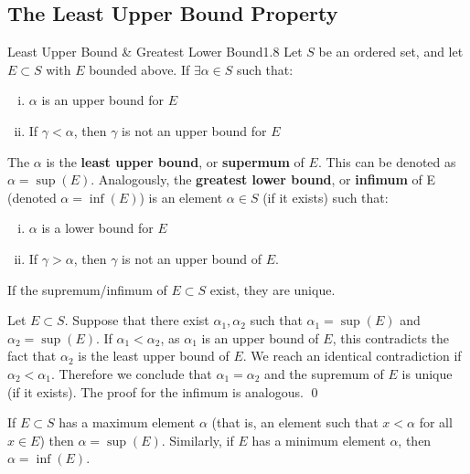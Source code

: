 \subsection{The Least Upper Bound Property}
\begin{definition}{Least Upper Bound \& Greatest Lower Bound}{1.8}
    Let $S$ be an ordered set, and let $E \subset S$ with $E$ bounded above. If $\exists \alpha \in S$ such that:
    \begin{enumerate}[(i)]
        \item $\alpha$ is an upper bound for $E$
        \item If $\gamma < \alpha$, then $\gamma$ is not an upper bound for $E$
    \end{enumerate} 
    The $\alpha$ is the \textbf{least upper bound}, or \textbf{supermum} of $E$. This can be denoted as $\alpha = \sup(E)$. Analogously, the \textbf{greatest lower bound}, or \textbf{infimum} of E (denoted $\alpha = \inf(E)$) is an element $\alpha \in S$ (if it exists) such that:
    \begin{enumerate}[(i)]
        \item $\alpha$ is a lower bound for $E$
        \item If $\gamma > \alpha$, then $\gamma$ is not an upper bound of $E$. 
    \end{enumerate}
\end{definition}

\begin{ntheorem}{}
    If the supremum/infimum of $E \subset S$ exist, they are unique.
\end{ntheorem}
\begin{nproof}
        Let $E \subset S$. Suppose that there exist $\alpha_1, \alpha_2$ such that $\alpha_1 = \sup(E)$ and $\alpha_2 = \sup(E)$. If $\alpha_1 < \alpha_2$, as $\alpha_1$ is an upper bound of $E$, this contradicts the fact that $\alpha_2$ is the least upper bound of $E$. We reach an identical contradiction if $\alpha_2 < \alpha_1$. Therefore we conclude that $\alpha_1 = \alpha_2$ and the supremum of $E$ is unique (if it exists). The proof for the infimum is analogous. \qed
\end{nproof}

\begin{ntheorem}{}
    If $E \subset S$ has a maximum element $\alpha$ (that is, an element such that $x < \alpha$ for all $x \in E$) then $\alpha = \sup(E)$. Similarly, if $E$ has a minimum element $\alpha$, then $\alpha = \inf(E)$.
\end{ntheorem}

